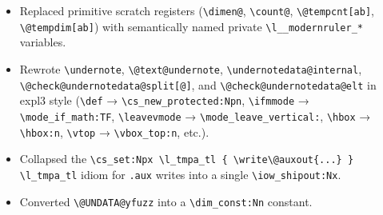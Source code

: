 \documentclass[luatex,fontsize=8pt,paper=b5,twoside]{jlreq}%
\begin{document}
\begin{itemize}
    \begin{itemize}
      \item Replaced primitive scratch registers (\verb|\dimen@|, \verb|\count@|, \verb|\@tempcnt[ab]|, \verb|\@tempdim[ab]|) with semantically named private \verb|\l__modernruler_*| variables.
      \item Rewrote \verb|\undernote|, \verb|\@text@undernote|, \verb|\undernotedata@internal|, \verb|\@check@undernotedata@split[@]|, and \verb|\@check@undernotedata@elt| in expl3 style (\verb|\def| → \verb|\cs_new_protected:Npn|, \verb|\ifmmode| → \verb|\mode_if_math:TF|, \verb|\leavevmode| → \verb|\mode_leave_vertical:|, \verb|\hbox| → \verb|\hbox:n|, \verb|\vtop| → \verb|\vbox_top:n|, etc.).
      \item Collapsed the \verb|\cs_set:Npx \l_tmpa_tl { \write\@auxout{...} } \l_tmpa_tl| idiom for \verb|.aux| writes into a single \verb|\iow_shipout:Nx|.
      \item Converted \verb|\@UNDATA@yfuzz| into a \verb|\dim_const:Nn| constant.
    \end{itemize}
\end{itemize}
\end{document}
